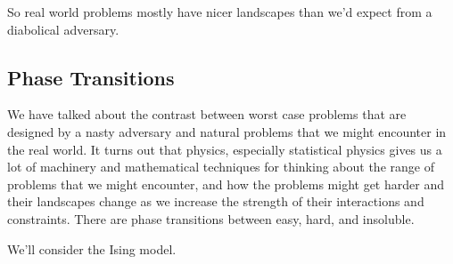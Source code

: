 \documentclass[]{article}
\begin{document}
So real world problems mostly have nicer landscapes than we'd expect from a diabolical adversary.
  
\subsection{Phase Transitions}

We have talked about the contrast between worst case problems that are designed by a nasty adversary and natural problems that we might encounter in the real world. It turns out that physics, especially statistical physics gives us a lot of machinery and mathematical techniques for thinking about the range of problems that we might encounter, and how the problems might get harder and their landscapes change as we increase the strength of their interactions and constraints. There are phase transitions between easy, hard, and insoluble.

We'll consider the Ising model.
\end{document}
